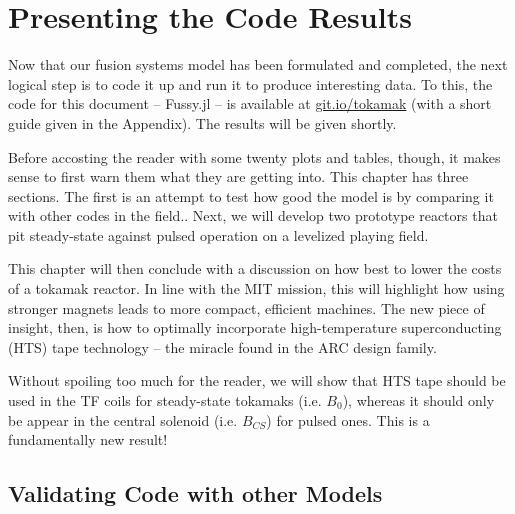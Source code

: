 %
%
%
%
%
%
%
%

\chapter{Presenting the Code Results}

Now that our fusion systems model has been formulated and completed, the next logical step is to code it up and run it to produce interesting data. To this, the code for this document -- Fussy.jl -- is available at \href{http://git.io/tokamak}{git.io/tokamak} (with a short guide given in the Appendix). The results will be given shortly.

Before accosting the reader with some twenty plots and tables, though, it makes sense to first warn them what they are getting into. This chapter has three sections. The first is an attempt to test how good the model is by comparing it with other codes in the field.\cite{arc,eupulsed,process}. Next, we will develop two prototype reactors that pit steady-state against pulsed operation on a levelized playing field.

This chapter will then conclude with a discussion on how best to lower the costs of a tokamak reactor. In line with the MIT mission, this will highlight how using stronger magnets leads to more compact, efficient machines. The new piece of insight, then, is how to optimally incorporate high-temperature superconducting (HTS) tape technology -- the miracle found in the ARC design family. 

Without spoiling too much for the reader, we will show that HTS tape should be used in the TF coils for steady-state tokamaks (i.e. $B_0$), whereas it should only be appear in the central solenoid (i.e. $B_{CS}$) for pulsed ones. This is a fundamentally new result!

\section{Validating Code with other Models}

